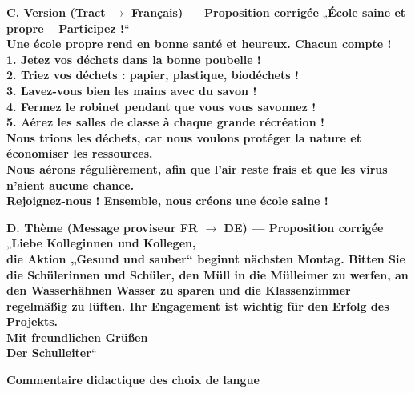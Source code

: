 \documentclass[11pt]{article}
\newcommand{\cle}[1]{{\popxbold\color{popdark}#1}}
\begin{document}
\begin{exoresolu}
\textbf{C. Version (Tract $\to$ Français) — Proposition corrigée}
„\textbf{École saine et propre – Participez !}“ \\
\textbf{Une école propre rend en bonne santé et heureux. Chacun compte !} \\
\textbf{1. Jetez vos déchets dans la bonne poubelle !} \\
\textbf{2. Triez vos déchets : papier, plastique, biodéchets !} \\
\textbf{3. Lavez-vous bien les mains avec du savon !} \\
\textbf{4. Fermez le robinet pendant que vous vous savonnez !} \\
\textbf{5. Aérez les salles de classe à chaque grande récréation !} \\
\textbf{Nous trions les déchets, \cle{car} nous voulons protéger la nature et économiser les ressources.} \\
\textbf{Nous aérons régulièrement, \cle{afin que} l'air reste frais et que les virus n'aient aucune chance.} \\
\textbf{\cle{Rejoignez-nous !} Ensemble, nous créons une école saine !}

\textbf{D. Thème (Message proviseur FR $\to$ DE) — Proposition corrigée}
„\textbf{Liebe Kolleginnen und Kollegen,} \\
\textbf{die Aktion „Gesund und sauber“ beginnt nächsten Montag. \cle{Bitten Sie} die Schülerinnen und Schüler, den Müll in die Mülleimer zu werfen, an den Wasserhähnen Wasser zu sparen und die Klassenzimmer regelmäßig zu lüften. \cle{Ihr Engagement} ist wichtig für den Erfolg des Projekts.} \\
\textbf{Mit freundlichen Grüßen} \\
\textbf{Der Schulleiter}“

\tcblower
\textbf{Commentaire didactique des choix de langue}


\end{exoresolu}
\end{document}
